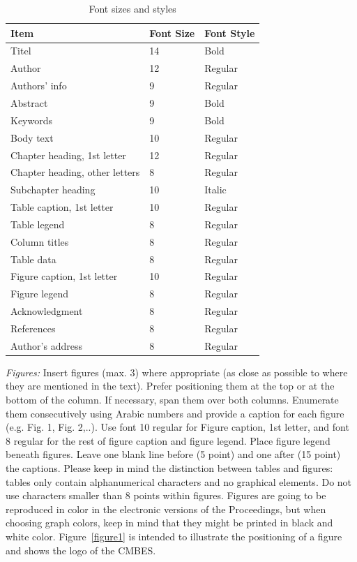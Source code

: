 \documentclass[nouppercase]{cmbec}
\begin{document}
\begin{table}[ht]
  \footnotesize \onehalfspacing
  \caption{Font sizes and styles}
  \begin{tabular}{p{3.90cm}p{1.40cm}p{1.90cm}}
     \hline
     \normalfont Item & Font Size & Font Style \\
     \hline
     Titel & 14 & Bold\\
     Author & 12 & Regular\\
     Authors' info & 9 & Regular\\
     Abstract & 9 & Bold\\
     Keywords & 9 & Bold\\
     Body text & 10 & Regular\\
     Chapter heading, 1st letter & 12 & Regular\\
     Chapter heading, other letters & 8 & Regular\\
     Subchapter heading & 10 & Italic\\
     Table caption, 1st letter & 10 & Regular\\
     Table legend & 8 & Regular\\
     Column titles & 8 & Regular\\
     Table data & 8 & Regular\\
     Figure caption, 1st letter & 10 & Regular\\
     Figure legend & 8 & Regular\\
     Acknowledgment & 8 & Regular\\
     References & 8 & Regular\\
     Author's address & 8 & Regular\\
     \hline
  \end{tabular}
  \label{table1}
\end{table}

\textit{Figures:} Insert figures (max. 3) where appropriate (as close as possible to where they are mentioned in the text). Prefer positioning them at the top or at the bottom of the column. If necessary, span them over both columns. Enumerate them consecutively using Arabic numbers and provide a caption for each figure (e.g. Fig. 1, Fig. 2,..). Use font 10 regular for Figure caption, 1st letter, and font 8 regular for the rest of figure caption and figure legend. Place figure legend beneath figures. Leave one blank line before (5 point) and one after (15 point) the captions. Please keep in mind the distinction between tables and figures: tables only contain alphanumerical characters and no graphical elements. Do not use characters smaller than 8 points within figures. Figures are going to be reproduced in color in the electronic versions of the Proceedings, but when choosing graph colors, keep in mind that they might be printed in black and white color. Figure~\ref{figure1} is intended to illustrate the positioning of a figure and shows the logo of the CMBES.
\end{document}
